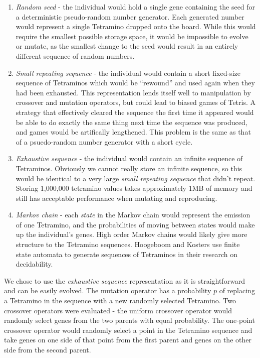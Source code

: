 \documentclass[a4paper,11pt]{article}
\begin{document}
\begin{enumerate}
  \item \emph{Random seed} - the individual would hold a single gene containing
      the seed for a deterministic pseudo-random number generator.
      Each generated number would represent a single Tetramino dropped onto the
      board.
      While this would require the smallest possible storage space, it would be
      impossible to evolve or mutate, as the smallest change to the seed would
      result in an entirely different sequence of random numbers.
  \item \emph{Small repeating sequence} - the individual would contain a short
      fixed-size sequence of Tetraminos which would be ``rewound'' and used
      again when they had been exhausted.
      This representation lends itself well to manipulation by crossover and
      mutation operators, but could lead to biased games of Tetris.
      A strategy that effectively cleared the sequence the first time it
      appeared would be able to do exactly the same thing next time the
      sequence was produced, and games would be artifically lengthened.
      This problem is the same as that of a psuedo-random number generator with
      a short cycle.
  \item \emph{Exhaustive sequence} - the individual would contain an infinite
      sequence of Tetraminos.
      Obviously we cannot really store an infinite sequence, so this would be
      identical to a very large \emph{small repeating sequence} that didn't
      repeat.
      Storing 1,000,000 tetramino values takes approximately 1MB of memory and
      still has acceptable performance when mutating and reproducing.
  \item \emph{Markov chain} - each \emph{state} in the Markov chain would
      represent the emission of one Tetramino, and the probabilities of moving
      between states would make up the individual's genes.
      High order Markov chains would likely give more structure to the
      Tetramino sequences.
      Hoogeboom and Kosters \cite{hoogeboom2004tetris} use finite state
      automata to generate sequences of Tetraminos in their research on
      decidability.
\end{enumerate}

We chose to use the \emph{exhaustive sequence} representation as it is
straightforward and can be easily evolved.
The mutation operator has a probability $p$ of replacing a Tetramino in the
sequence with a new randomly selected Tetramino.
Two crossover operators were evaluated - the uniform crossover operator would
randomly select genes from the two parents with equal probability.
The one-point crossover operator would randomly select a point in the Tetramino
sequence and take genes on one side of that point from the first parent and
genes on the other side from the second parent.
\end{document}
